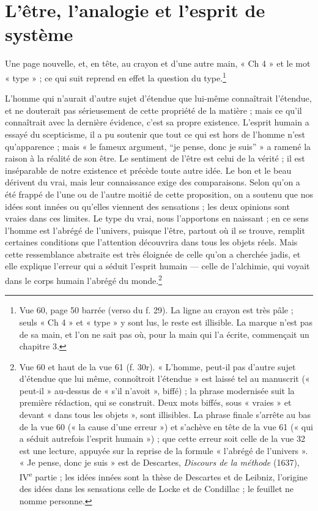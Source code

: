 \documentclass[11pt,a4paper]{article}
\begin{document}
\section*{L'être, l'analogie et l'esprit de système}

Une page nouvelle, et, en tête, au crayon et d'une autre main, « Ch 4 » et le mot
« type » ; ce qui suit reprend en effet la question du type.\footnote{Vue 60,
page 50 barrée (verso du f. 29). La ligne au crayon est très pâle ; seuls
« Ch 4 » et « type » y sont lus, le reste est illisible. La marque n'est pas de
sa main, et l'on ne sait pas où, pour la main qui l'a écrite, commençait un
chapitre 3.}

L'homme qui n'aurait d'autre sujet d'étendue que lui-même connaîtrait l'étendue,
et ne douterait pas sérieusement de cette propriété de la matière ; mais ce
qu'il connaîtrait avec la dernière évidence, c'est sa propre existence. L'esprit
humain a essayé du scepticisme, il a pu soutenir que tout ce qui est hors de
l'homme n'est qu'apparence ; mais « le fameux argument, “je pense, donc je
suis” » a ramené la raison à la réalité de son être. Le sentiment de l'être est
celui de la vérité ; il est inséparable de notre existence et précède toute autre
idée. Le bon et le beau dérivent du vrai, mais leur connaissance exige des
comparaisons. Selon qu'on a été frappé de l'une ou de l'autre moitié de cette
proposition, on a soutenu que nos idées sont innées ou qu'elles viennent des
sensations ; les deux opinions sont vraies dans ces limites. Le type du vrai,
nous l'apportons en naissant ; en ce sens l'homme est l'abrégé de l'univers,
puisque l'être, partout où il se trouve, remplit certaines conditions que
l'attention découvrira dans tous les objets réels. Mais cette ressemblance
abstraite est très éloignée de celle qu'on a cherchée jadis, et elle explique
l'erreur qui a séduit l'esprit humain — celle de l'alchimie, qui voyait dans le
corps humain l'abrégé du monde.\footnote{Vue 60 et haut de la vue 61 (f. 30r).
« L'homme, peut-il pas d'autre sujet d'étendue que lui même, connoîtroit
l'étendue » est laissé tel au manuscrit (« peut-il » au-dessus de « s'il
n'avoit », biffé) ; la phrase modernisée suit la première rédaction, qui se
construit. Deux mots biffés, sous « vraies » et devant « dans tous les objets »,
sont illisibles. La phrase finale s'arrête au bas de la vue 60 (« la cause d'une
erreur ») et s'achève en tête de la vue 61 (« qui a séduit autrefois l'esprit
humain ») ; que cette erreur soit celle de la vue 32 est une lecture, appuyée
sur la reprise de la formule « l'abrégé de l'univers ». « Je pense, donc je
suis » est de Descartes, \emph{Discours de la méthode} (1637), IV\textsuperscript{e}
partie ; les idées innées sont la thèse de Descartes et de Leibniz, l'origine
des idées dans les sensations celle de Locke et de Condillac ; le feuillet ne
nomme personne.}
\end{document}
